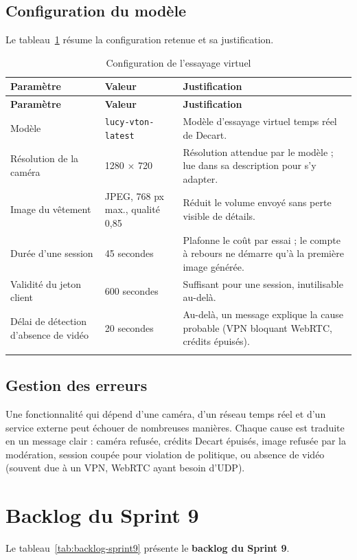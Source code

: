 \subsection{Configuration du modèle}
Le tableau~\ref{tab:config-tryon} résume la configuration retenue et sa justification.
\renewcommand{\arraystretch}{1.3}
\begin{longtable}{|p{4.2cm}|p{3.6cm}|p{6.6cm}|}
\hline
\textbf{Paramètre} & \textbf{Valeur} & \textbf{Justification} \\
\hline
\endfirsthead
\hline
\textbf{Paramètre} & \textbf{Valeur} & \textbf{Justification} \\
\hline
\endhead
Modèle & \texttt{lucy-vton-latest} & Modèle d'essayage virtuel temps réel de Decart. \\
\hline
Résolution de la caméra & 1280 × 720 & Résolution attendue par le modèle ; lue dans sa description pour s'y adapter. \\
\hline
Image du vêtement & JPEG, 768 px max., qualité 0,85 & Réduit le volume envoyé sans perte visible de détails. \\
\hline

Durée d'une session & 45 secondes & Plafonne le coût par essai ; le compte à rebours ne démarre qu'à la première image générée. \\
\hline
Validité du jeton client & 600 secondes & Suffisant pour une session, inutilisable au-delà. \\
\hline
Délai de détection d'absence de vidéo & 20 secondes & Au-delà, un message explique la cause probable (VPN bloquant WebRTC, crédits épuisés). \\
\hline
\caption{Configuration de l'essayage virtuel}
\label{tab:config-tryon}
\end{longtable}

\subsection{Gestion des erreurs}
Une fonctionnalité qui dépend d'une caméra, d'un réseau temps réel et d'un service externe peut échouer de nombreuses manières. Chaque cause est traduite en un message clair : caméra refusée, crédits Decart épuisés, image refusée par la modération, session coupée pour violation de politique, ou absence de vidéo (souvent due à un VPN, WebRTC ayant besoin d'UDP).
\section{Backlog du Sprint 9}
Le tableau~\ref{tab:backlog-sprint9} présente le \textbf{backlog du Sprint 9}.


